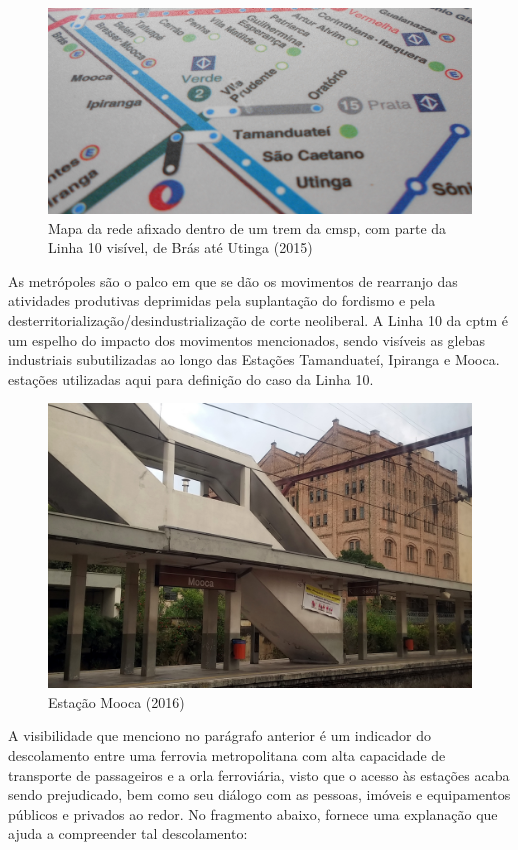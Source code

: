 	\begin{figure}[h]
		\caption{Mapa da rede afixado dentro de um trem da \gls{cmsp}, com parte da Linha 10 visível, de Brás até Utinga (2015)}
		\includegraphics[keepaspectratio,width=\textwidth]{fotos/DSCN5732.JPG}
	\end{figure}
	
	As metrópoles são o palco em que se dão os movimentos de rearranjo das atividades produtivas deprimidas pela suplantação do fordismo e pela desterritorialização/desindustrialização de corte neoliberal. A Linha 10 da \gls{cptm} é um espelho do impacto dos movimentos mencionados, sendo visíveis as glebas industriais subutilizadas ao longo das Estações Tamanduateí, Ipiranga e Mooca. estações utilizadas aqui para definição do caso da Linha 10.
	
	\begin{figure}[h]
		\caption{Estação Mooca (2016)}
		\includegraphics[width = \textwidth]{fotos/IMG_20160317_165438b.jpg}
	\end{figure}
	
	A visibilidade que menciono no parágrafo anterior é um indicador do descolamento entre uma ferrovia metropolitana com alta capacidade de transporte de passageiros e a orla ferroviária, visto que o acesso às estações acaba sendo prejudicado, bem como seu diálogo com as pessoas, imóveis e equipamentos públicos e privados ao redor. No fragmento abaixo,  fornece uma explanação que ajuda a compreender tal descolamento:
	
